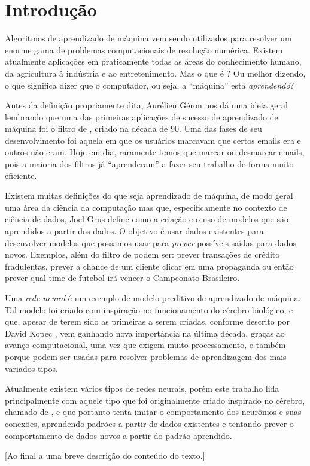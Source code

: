 
\chapter{Introdução}
\label{cap:introducao}


Algoritmos de aprendizado de máquina vem sendo utilizados para resolver um enorme gama de problemas computacionais de resolução numérica. Existem atualmente aplicações em praticamente todas as áreas do conhecimento humano, da agricultura à indústria e ao entretenimento. Mas o que é ? Ou melhor dizendo, o que significa dizer que o computador, ou seja, a ``máquina'' está \emph{aprendendo}? 

Antes da definição propriamente dita, Aurélien Géron \citep{hands} nos dá uma ideia geral lembrando que uma das primeiras aplicações de sucesso de aprendizado de máquina foi o filtro de , criado na década de 90. Uma das fases de seu desenvolvimento foi aquela em que os usuários marcavam que certos emails era  e outros não eram. Hoje em dia, raramente temos que marcar ou desmarcar emails, pois a maioria dos filtros já ``aprenderam'' a fazer seu trabalho de forma muito eficiente.

Existem muitas definições do que seja aprendizado de máquina, de modo geral uma área da ciência da computação mas que, especificamente no contexto de ciência de dados, Joel Grus \citep{data} define como a criação e o uso de modelos que são aprendidos a partir dos dados. O objetivo é usar dados existentes para desenvolver modelos que possamos usar para \emph{prever} possíveis saídas para dados novos. Exemplos, além do filtro de  podem ser: prever transações de crédito fradulentas, prever a chance de um cliente clicar em uma propaganda ou então prever qual time de futebol irá vencer o Campeonato Brasileiro.

Uma \emph{rede neural} é um exemplo de modelo preditivo de aprendizado de máquina. Tal modelo foi criado com inspiração no funcionamento do cérebro biológico, e que, apesar de terem sido as primeiras a serem criadas, conforme descrito por David Kopec \citep{classic}, vem ganhando nova importância na última década, graças ao avanço computacional, uma vez que exigem muito processamento, e também porque podem ser usadas para resolver problemas de aprendizagem dos mais variados tipos.

Atualmente existem vários tipos de redes neurais, porém este trabalho lida principalmente com aquele tipo que foi originalmente criado inspirado no cérebro, chamado de , e que portanto tenta imitar o comportamento dos neurônios e suas conexões, aprendendo padrões a partir de dados existentes e tentando prever o comportamento de dados novos a partir do padrão aprendido.

[Ao final a uma breve descrição do conteúdo do texto.]